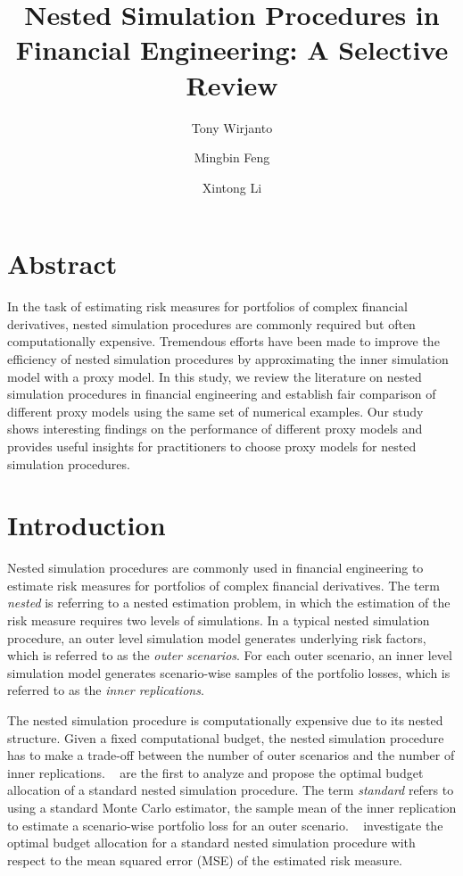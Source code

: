 \documentclass{article}
\title{Nested Simulation Procedures in Financial Engineering: A Selective Review}
\author{Tony Wirjanto \and Mingbin Feng \and Xintong Li}
\date{}
\begin{document}
\maketitle

\section*{Abstract}

In the task of estimating risk measures for portfolios of complex financial derivatives, nested simulation procedures are commonly required but often computationally expensive. 
Tremendous efforts have been made to improve the efficiency of nested simulation procedures by approximating the inner simulation model with a proxy model. 
In this study, we review the literature on nested simulation procedures in financial engineering and establish fair comparison of different proxy models using the same set of numerical examples. 
Our study shows interesting findings on the performance of different proxy models and provides useful insights for practitioners to choose proxy models for nested simulation procedures.

\section{Introduction}

Nested simulation procedures are commonly used in financial engineering to estimate risk measures for portfolios of complex financial derivatives. 
The term \textit{nested} is referring to a nested estimation problem, in which the estimation of the risk measure requires two levels of simulations.
In a typical nested simulation procedure, an outer level simulation model generates underlying risk factors, which is referred to as the \textit{outer scenarios}.
For each outer scenario, an inner level simulation model generates scenario-wise samples of the portfolio losses, which is referred to as the \textit{inner replications}.

The nested simulation procedure is computationally expensive due to its nested structure. 
Given a fixed computational budget, the nested simulation procedure has to make a trade-off between the number of outer scenarios and the number of inner replications.
~\cite{gordy2010nested} are the first to analyze and propose the optimal budget allocation of a standard nested simulation procedure. 
The term \textit{standard} refers to using a standard Monte Carlo estimator, the sample mean of the inner replication to estimate a scenario-wise portfolio loss for an outer scenario.
~\cite{gordy2010nested} investigate the optimal budget allocation for a standard nested simulation procedure with respect to the mean squared error (MSE) of the estimated risk measure. 
\end{document}
